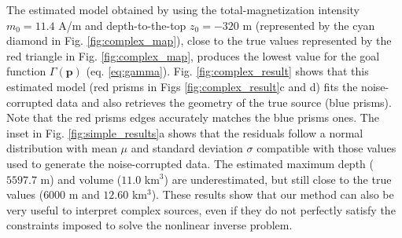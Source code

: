 The estimated model obtained by using the total-magnetization intensity $ m_0 = 11.4 $ A/m and depth-to-the-top $ z_0 = -320 $ m (represented by the cyan diamond in Fig. \ref{fig:complex_map}), close to the true values represented by the red
triangle in Fig. \ref{fig:complex_map}, produces the lowest value for the goal function 
$ \Gamma(\mathbf{p}) $ (eq. \ref{eq:gamma}). Fig. \ref{fig:complex_result} shows that this estimated model (red prisms in Figs \ref{fig:complex_result}c and d) fits the noise-corrupted data and also retrieves the geometry of the true source (blue prisms). 
Note that the red prisms edges accurately matches the blue prisms ones. 
The inset in Fig. \ref{fig:simple_results}a shows that the residuals follow a normal 
distribution with mean $ \mu $ and standard deviation $ \sigma $ compatible with those 
values used to generate the noise-corrupted data. 
The estimated maximum depth ($ 5597.7 $ m) and volume ($ 11.0 $ km$^3 $) are underestimated, but still close to the true values ($ 6000 $ m and $ 12.60 $ km$^3 $). 
These results show that our method can also be very useful to interpret complex sources, even if they do not perfectly satisfy the constraints imposed to solve the nonlinear inverse problem.